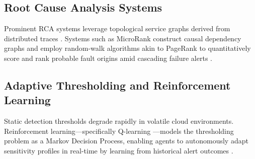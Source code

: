 \subsection{Root Cause Analysis Systems}
\label{subsec:rw_rca}

Prominent RCA systems leverage topological service graphs derived from distributed
traces \cite{sigelman2010dapper, zhang2019rootcause}. Systems such as MicroRank
construct causal dependency graphs and employ random-walk algorithms akin to PageRank
\cite{page1999pagerank} to quantitatively score and rank probable fault origins amid
cascading failure alerts \cite{li2018microrank}.

\subsection{Adaptive Thresholding and Reinforcement Learning}
\label{subsec:rw_adaptive}

Static detection thresholds degrade rapidly in volatile cloud environments.
Reinforcement learning---specifically Q-learning \cite{watkins1992qlearning}---models
the thresholding problem as a Markov Decision Process, enabling agents to autonomously
adapt sensitivity profiles in real-time by learning from historical alert outcomes
\cite{sutton2018reinforcement, liu2020rlthreshold}.
